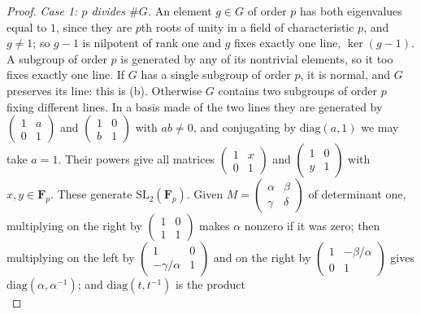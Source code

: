 \documentclass[11pt]{amsart}
\theoremstyle{definition}
\newcommand{\F}{\mathbf{F}}
\newcommand{\SL}{\mathrm{SL}}
\begin{document}
\begin{proof}
\emph{Case 1: $p$ divides $\#G$.} An element $g\in G$ of order $p$ has both eigenvalues equal to $1$, since they are $p$th roots of unity in a field of characteristic $p$, and $g\ne1$; so $g-1$ is nilpotent of rank one and $g$ fixes exactly one line, $\ker(g-1)$. A subgroup of order $p$ is generated by any of its nontrivial elements, so it too fixes exactly one line. If $G$ has a single subgroup of order $p$, it is normal, and $G$ preserves its line: this is (b). Otherwise $G$ contains two subgroups of order $p$ fixing different lines. In a basis made of the two lines they are generated by $\left(\begin{smallmatrix}1&a\\0&1\end{smallmatrix}\right)$ and $\left(\begin{smallmatrix}1&0\\b&1\end{smallmatrix}\right)$ with $ab\ne0$, and conjugating by $\mathrm{diag}(a,1)$ we may take $a=1$. Their powers give all matrices $\left(\begin{smallmatrix}1&x\\0&1\end{smallmatrix}\right)$ and $\left(\begin{smallmatrix}1&0\\y&1\end{smallmatrix}\right)$ with $x,y\in\F_p$. These generate $\SL_2(\F_p)$. Given $M=\left(\begin{smallmatrix}\alpha&\beta\\\gamma&\delta\end{smallmatrix}\right)$ of determinant one, multiplying on the right by $\left(\begin{smallmatrix}1&0\\1&1\end{smallmatrix}\right)$ makes $\alpha$ nonzero if it was zero; then multiplying on the left by $\left(\begin{smallmatrix}1&0\\-\gamma/\alpha&1\end{smallmatrix}\right)$ and on the right by $\left(\begin{smallmatrix}1&-\beta/\alpha\\0&1\end{smallmatrix}\right)$ gives $\mathrm{diag}(\alpha,\alpha^{-1})$; and $\mathrm{diag}(t,t^{-1})$ is the product
\[
\]
\end{proof}
\end{document}
